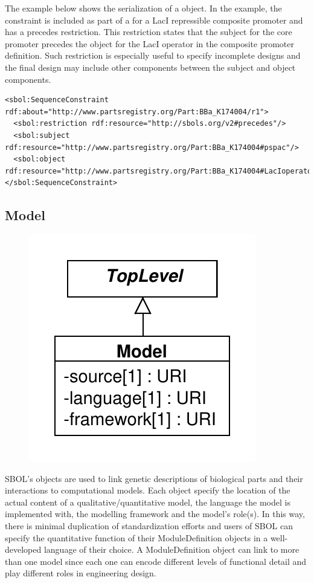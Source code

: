 The example below shows the serialization of a  object. In the example, the constraint is included as part of a  for a LacI repressible composite promoter and has a precedes restriction. This restriction states that the subject  for the core promoter precedes the object  for the LacI operator in the composite promoter definition. Such restriction is especially useful to specify incomplete designs and the final design may include other components between the subject and object components. 
\begin{lstlisting}
<sbol:SequenceConstraint rdf:about="http://www.partsregistry.org/Part:BBa_K174004/r1">
  <sbol:restriction rdf:resource="http://sbols.org/v2#precedes"/>
  <sbol:subject rdf:resource="http://www.partsregistry.org/Part:BBa_K174004#pspac"/>
  <sbol:object rdf:resource="http://www.partsregistry.org/Part:BBa_K174004#LacIoperator"/>
</sbol:SequenceConstraint>
\end{lstlisting}
      
      
\subsection{Model}
\label{sec:Model}

\begin{figure}[ht]
\begin{center}
\includegraphics[scale=0.6]{uml/model}
\caption[]{}
\label{uml:model}
\end{center}
\end{figure}
SBOL's  objects are used to link genetic descriptions of biological parts and their interactions to computational models. Each  object specify the location of the actual content of a qualitative/quantitative model, the language the model is implemented with, the modelling framework and the model's role(s). In this way, there is minimal duplication of standardization efforts and users of SBOL can specify the quantitative function of their ModuleDefinition objects in a well-developed language of their choice. A ModuleDefinition object can link to more than one model since each one can encode different levels of functional detail and play different roles in engineering design. 


